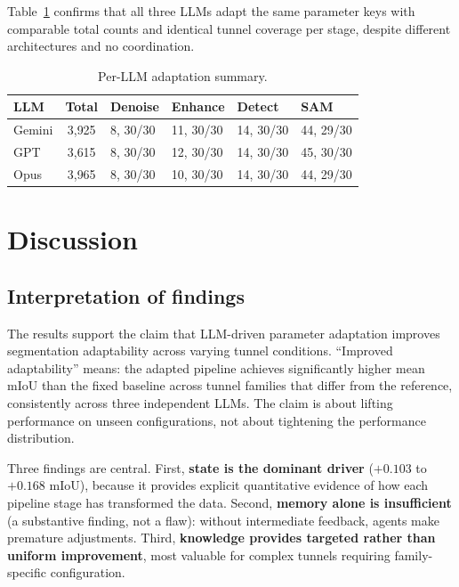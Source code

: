 \documentclass[a4paper,fleqn]{cas-dc}
\begin{document}
Table~\ref{tab:llm-adapt} confirms that all three LLMs adapt the same parameter keys with comparable total counts and identical tunnel coverage per stage, despite different architectures and no coordination.

\begin{table}[ht]
\caption{Per-LLM adaptation summary.}\label{tab:llm-adapt}
\begin{tabular*}{\tblwidth}{@{} l c l l l l @{}}
\toprule
LLM & Total & Denoise & Enhance & Detect & SAM \\
\midrule
Gemini & 3{,}925 & 8, 30/30 & 11, 30/30 & 14, 30/30 & 44, 29/30 \\
GPT & 3{,}615 & 8, 30/30 & 12, 30/30 & 14, 30/30 & 45, 30/30 \\
Opus & 3{,}965 & 8, 30/30 & 10, 30/30 & 14, 30/30 & 44, 29/30 \\
\bottomrule
\end{tabular*}
\end{table}

\section{Discussion}\label{sec:discussion}

\subsection{Interpretation of findings}

The results support the claim that LLM-driven parameter adaptation improves segmentation adaptability across varying tunnel conditions. ``Improved adaptability'' means: the adapted pipeline achieves significantly higher mean mIoU than the fixed baseline across tunnel families that differ from the reference, consistently across three independent LLMs. The claim is about lifting performance on unseen configurations, not about tightening the performance distribution.

Three findings are central. First, \textbf{state is the dominant driver} ($+0.103$ to $+0.168$ mIoU), because it provides explicit quantitative evidence of how each pipeline stage has transformed the data. Second, \textbf{memory alone is insufficient} (a substantive finding, not a flaw): without intermediate feedback, agents make premature adjustments. Third, \textbf{knowledge provides targeted rather than uniform improvement}, most valuable for complex tunnels requiring family-specific configuration.
\end{document}
